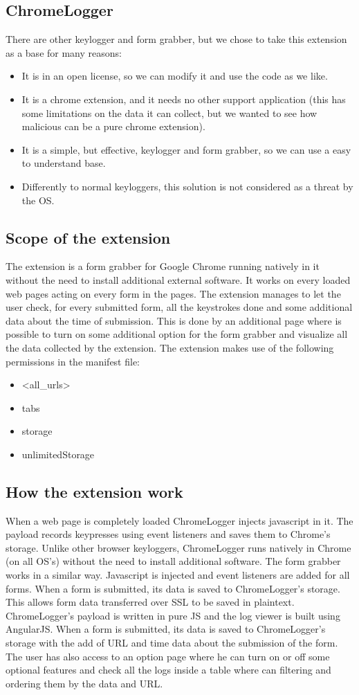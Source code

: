 \documentclass[12pt]{article}
\begin{document}
\begin{multicols}{2}
\section*{ChromeLogger}
There are other keylogger and form grabber, but we chose to take this extension as a base for many reasons:
\begin{itemize}
	\item It is in an open license, so we can modify it and use the code as we like.
	\item It is a chrome extension, and it needs no other support application (this has some limitations on the data it can collect, but we wanted to see how malicious can be a pure chrome extension).
	\item It is a simple, but effective, keylogger and form grabber, so we can use a easy to understand base.
	\item Differently to normal keyloggers, this solution is not considered as a threat by the OS.
\end{itemize} 
\subsection*{Scope of the extension}
The extension is a form grabber for Google Chrome running natively in it without the need to install additional external software. It works on every loaded web pages acting on every form in the pages.
The extension manages to let the user check, for every submitted form, all the keystrokes done and some additional data about the time of submission. This is done by an additional page where is possible to turn on some additional option for the form grabber and visualize all the data collected by the extension.
The extension makes use of the following permissions in the manifest file:
\begin{itemize}
	\item  <all\_urls>
	\item  tabs
	\item  storage
	\item  unlimitedStorage
\end{itemize}
\subsection*{How the extension work}
When a web page is completely loaded ChromeLogger injects javascript in it. The payload records keypresses using event listeners and saves them to Chrome's storage. Unlike other browser keyloggers, ChromeLogger runs natively in Chrome (on all OS's) without the need to install additional software.
The form grabber works in a similar way. Javascript is injected and event listeners are added for all forms. When a form is submitted, its data is saved to ChromeLogger's storage. This allows form data transferred over SSL to be saved in plaintext.
ChromeLogger's payload is written in pure JS and the log viewer is built using AngularJS. When a form is submitted, its data is saved to ChromeLogger's storage with the add of URL and time data about the submission of the form.
The user has also access to an option page where he can turn on or off some optional features and check all the logs inside a table where can filtering and ordering them by the data and URL.

\end{multicols}
\end{document}
